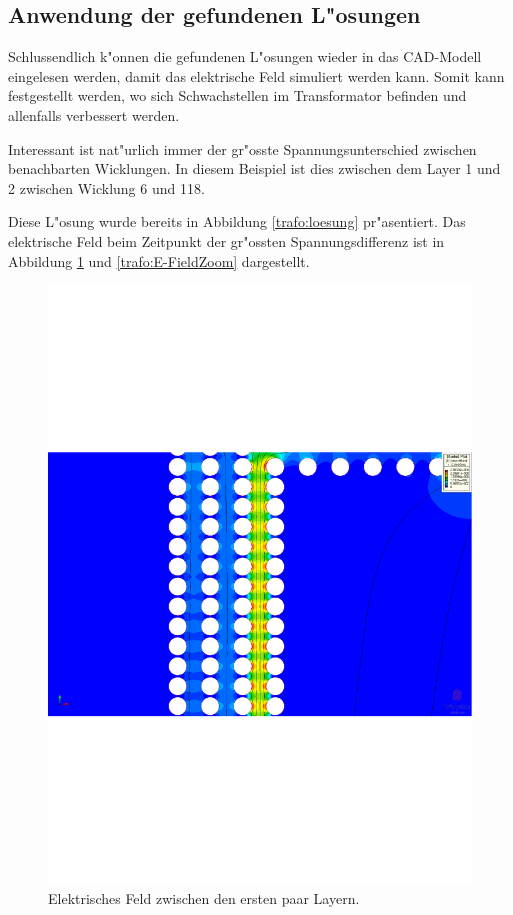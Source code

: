 \begin{refsection}
\section{Anwendung der gefundenen L"osungen}

Schlussendlich k"onnen die gefundenen L"osungen wieder in das CAD-Modell eingelesen werden, damit das elektrische Feld simuliert werden kann. Somit kann festgestellt werden, wo sich Schwachstellen im Transformator befinden und allenfalls verbessert werden.

Interessant ist nat"urlich immer der gr"osste Spannungsunterschied zwischen benachbarten Wicklungen. In diesem Beispiel ist dies zwischen dem Layer 1 und 2 zwischen Wicklung 6 und 118.

Diese L"osung wurde bereits in Abbildung \ref{trafo:loesung} pr"asentiert. Das elektrische Feld beim Zeitpunkt der gr"ossten Spannungsdifferenz ist in Abbildung \ref{trafo:E-Field} und \ref{trafo:E-FieldZoom} dargestellt. 

\begin{figure}
	\centering
	\includegraphics[width=\textwidth]{./trafo/images/BIL_VoltageTrans.pdf}
	\caption{Elektrisches Feld zwischen den ersten paar Layern.}
	\label{trafo:E-Field}
\end{figure}


\end{refsection}
